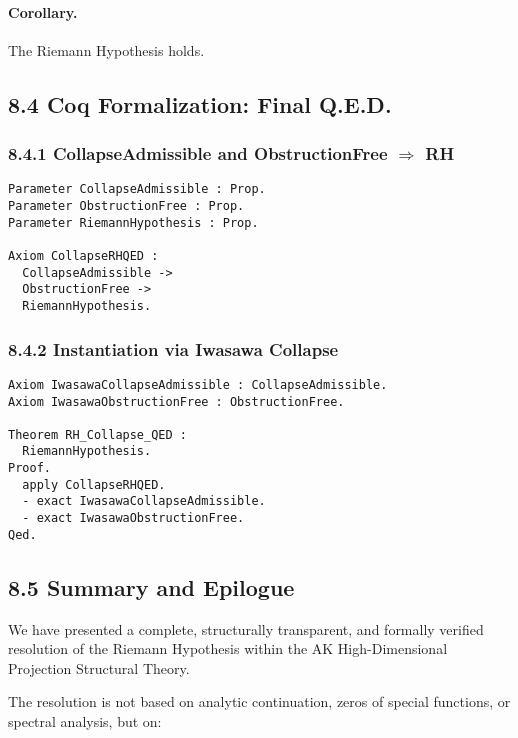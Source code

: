 \documentclass[11pt]{article}
\begin{document}
\paragraph{Corollary.} The Riemann Hypothesis holds.

\subsection*{8.4 Coq Formalization: Final Q.E.D.}

\subsubsection*{8.4.1 CollapseAdmissible and ObstructionFree \(\Rightarrow\) RH}

\begin{lstlisting}[language=Coq, caption=Collapse RH Q.E.D. Theorem, captionpos=b]
Parameter CollapseAdmissible : Prop.
Parameter ObstructionFree : Prop.
Parameter RiemannHypothesis : Prop.

Axiom CollapseRHQED :
  CollapseAdmissible ->
  ObstructionFree ->
  RiemannHypothesis.
\end{lstlisting}

\subsubsection*{8.4.2 Instantiation via Iwasawa Collapse}

\begin{lstlisting}[language=Coq, caption=Iwasawa Collapse Implies RH, captionpos=b]
Axiom IwasawaCollapseAdmissible : CollapseAdmissible.
Axiom IwasawaObstructionFree : ObstructionFree.

Theorem RH_Collapse_QED :
  RiemannHypothesis.
Proof.
  apply CollapseRHQED.
  - exact IwasawaCollapseAdmissible.
  - exact IwasawaObstructionFree.
Qed.
\end{lstlisting}

\subsection*{8.5 Summary and Epilogue}

We have presented a complete, structurally transparent, and formally verified resolution of the Riemann Hypothesis within the AK High-Dimensional Projection Structural Theory.

The resolution is not based on analytic continuation, zeros of special functions, or spectral analysis, but on:
\end{document}
